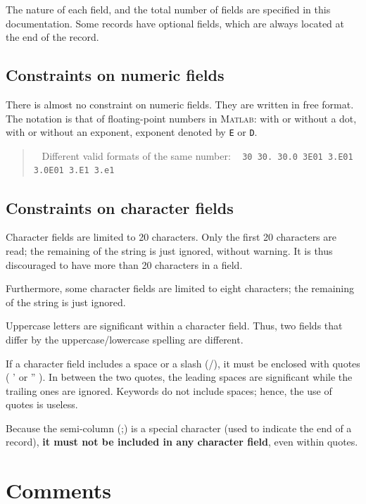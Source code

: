 The nature of each field, and the total number of fields are specified in this documentation. Some records have optional fields, which are always located at the end of the record.

\subsection{Constraints on numeric fields}

There is almost no constraint on numeric fields. They are written in free format. The notation is that of floating-point numbers in \textsc{Matlab}: with or without a dot, with or without an exponent, exponent denoted by {\tt E} or {\tt D}.

\begin{quote}
\faHandPointRight ~ \rm Different valid formats of the same number: ~ \mbox{\tt 30 30.~30.0 3E01 3.E01 3.0E01 3.E1 3.e1}
\end{quote} 

\subsection{Constraints on character fields}

Character fields are limited to 20 characters. Only the first 20 characters are read; the remaining of the string is just ignored, without warning. It is thus discouraged to have more than 20 characters in a field. 

Furthermore, some character fields are limited to eight characters; the remaining of the string is just ignored.

Uppercase letters are significant within a character field. Thus, two fields that differ by the uppercase/lowercase spelling are different.

If a character field includes a space or a slash (/), it must be enclosed with quotes ( ' or '' ). In between the two quotes, the leading spaces are significant while the trailing ones are ignored. Keywords do not include spaces; hence, the use of quotes is useless.

Because the semi-column (;) is a special character (used to indicate the end of a record), {\bf \large it must not be included in any  character field}, even within quotes.

\section{Comments}

